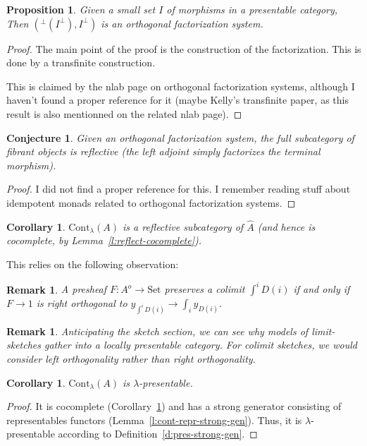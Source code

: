 \documentclass{article}
\newcommand{\Cont}[1]{\text{Cont}_{#1}}
\newcommand{\Set}{\text{Set}}
\newtheorem{conjecture}[theorem]{Conjecture}
\newtheorem{proposition}[theorem]{Proposition}
\newtheorem{corollary}[theorem]{Corollary}
\newtheorem{remark}[theorem]{Remark}
\begin{document}
\begin{proposition}
 Given a small set $I$ of morphisms in a presentable category,
 Then $({}^\bot (I^\bot), I^\bot)$ is an orthogonal factorization system.
\end{proposition}
\begin{proof}
  The main point of the proof is the construction of the factorization.
  This is done by a transfinite construction.

This is claimed by the nlab page on orthogonal factorization systems, although I
haven't found a proper reference for it (maybe Kelly's transfinite paper, as
this result is also mentionned on the related nlab page).
\end{proof}
\begin{conjecture}
  \label{conj:fibrant-reflective}
 Given an orthogonal factorization system, the full subcategory of fibrant
 objects is reflective (the left adjoint simply factorizes the
 terminal morphism). 
\end{conjecture}
\begin{proof}
  I did not find a proper reference for this. I remember reading stuff about
  idempotent monads related to orthogonal factorization systems.
\end{proof}
\begin{corollary}
  \label{cor:cont-refl}
 $\Cont\lambda(A)$ is a reflective subcategory of $\hat{A}$ (and hence is
 cocomplete, by Lemma~\ref{l:reflect-cocomplete}).
\end{corollary}
This relies on the following observation:
\begin{remark}
  A presheaf $F:A^o \rightarrow \Set$  preserves a colimit $\int^i D(i)$ if and
  only if
  $F\rightarrow 1$ is right orthogonal to $y_{\int^i D(i)}\rightarrow \int_i y_{D(i)}  $.
\end{remark}
\begin{remark}
  Anticipating the sketch section, we can see why models of limit-sketches gather
  into a locally presentable category. For colimit sketches, we would consider
  left orthogonality rather than right orthogonality.
\end{remark}
\begin{corollary}
 $\Cont\lambda(A)$ is $\lambda$-presentable.
\end{corollary}
\begin{proof}
  It is cocomplete (Corollary~\ref{cor:cont-refl})
  and has a strong generator consisting of representables
  functors (Lemma~\ref{l:cont-repr-strong-gen}). Thus, it is $\lambda$-presentable according to
Definition~\ref{d:pres-strong-gen}.
\end{proof}
\end{document}
